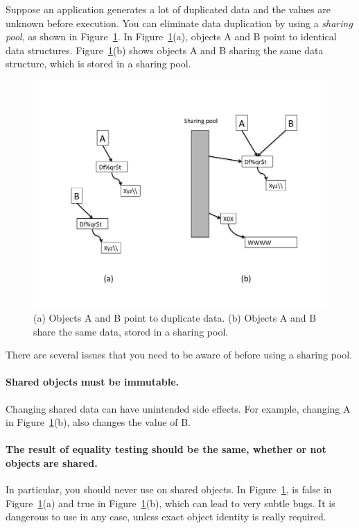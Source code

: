 Suppose an application generates a lot of duplicated data and the values
are unknown before execution. 
You can eliminate data duplication by using a \emph{sharing pool}, as shown
in Figure~\ref{fig:sharing-pool}. In Figure~\ref{fig:sharing-pool}(a), objects
A and B point to identical data structures.
Figure~\ref{fig:sharing-pool}(b) shows objects A and B sharing the same data
structure, which is stored in a sharing pool.
 \begin{figure}
  \centering
 \includegraphics[width=.80\textwidth]{part1/Figures/modelingdatatypes/sharing-pool.pdf}
  \caption{(a) Objects A and B point to duplicate data. (b) Objects A and B
  share the same data, stored in a sharing pool.}
  \label{fig:sharing-pool}
\end{figure}


There are several issues that you need to be aware of before using a sharing
pool.
\paragraph{Shared objects must be immutable.} Changing shared data can
have unintended side effects. For example, 
changing A in Figure~\ref{fig:sharing-pool}(b), 
also changes the value of B.

\paragraph{The result of equality testing should be the same, whether or
not objects are shared.}
 In particular, you should never use \code{==} on shared objects.
In Figure~\ref{fig:sharing-pool},  is false in
Figure~\ref{fig:sharing-pool}(a) and true in Figure~\ref{fig:sharing-pool}(b),
 which can lead to very subtle bugs. It is dangerous to use \code{==} in any
 case, unless exact object identity is really required.
 
